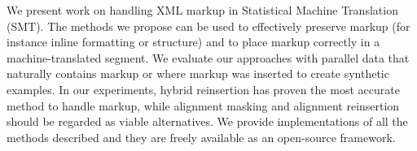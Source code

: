 We present work on handling XML markup in Statistical Machine Translation (SMT). The methods we propose can be used to effectively preserve markup (for instance inline formatting or structure) and to place markup correctly in a machine-translated segment. We evaluate our approaches with parallel data that naturally contains markup or where markup was inserted to create synthetic examples. In our experiments, hybrid reinsertion has proven the most accurate method to handle markup, while alignment masking and alignment reinsertion should be regarded as viable alternatives. We provide implementations of all the methods described and they are freely available as an open-source framework.
